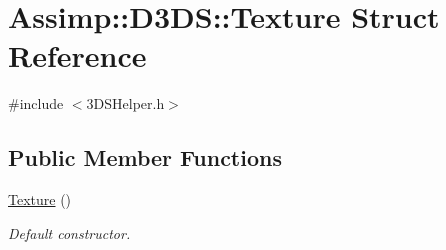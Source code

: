 \hypertarget{struct_assimp_1_1_d3_d_s_1_1_texture}{\section{Assimp\+:\+:D3\+D\+S\+:\+:Texture Struct Reference}
\label{struct_assimp_1_1_d3_d_s_1_1_texture}
}


{\ttfamily \#include $<$3\+D\+S\+Helper.\+h$>$}

\subsection*{Public Member Functions}
\begin{DoxyCompactItemize}
\item 
\hypertarget{struct_assimp_1_1_d3_d_s_1_1_texture_a483d56793ca86af3d67675753a301abe}{\hyperlink{struct_assimp_1_1_d3_d_s_1_1_texture_a483d56793ca86af3d67675753a301abe}{Texture} ()}\label{struct_assimp_1_1_d3_d_s_1_1_texture_a483d56793ca86af3d67675753a301abe}

\begin{DoxyCompactList}\small\item\em Default constructor. \end{DoxyCompactList}\end{DoxyCompactItemize}
